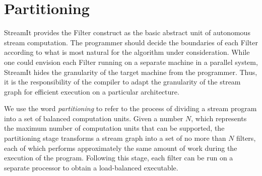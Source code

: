 \section{Partitioning}
\label{sec:partition}

StreamIt provides the Filter construct as the basic abstract unit of
autonomous stream computation.  The programmer should decide the
boundaries of each Filter according to what is most natural for the
algorithm under consideration.  While one could envision each Filter
running on a separate machine in a parallel system, StreamIt hides the
granularity of the target machine from the programmer.  Thus, it is
the responsibility of the compiler to adapt the granularity of the
stream graph for efficient execution on a particular architecture.

We use the word {\it partitioning} to refer to the process of dividing
a stream program into a set of balanced computation units.  Given a
number $N$, which represents the maximum number of computation units
that can be supported, the partitioning stage transforms a stream
graph into a set of no more than $N$ filters, each of which performs
approximately the same amount of work during the execution of the
program.  Following this stage, each filter can be run on a separate
processor to obtain a load-balanced executable.

